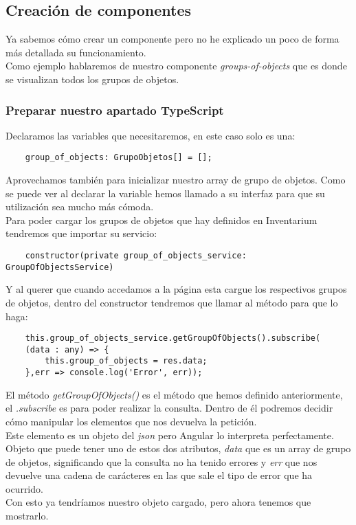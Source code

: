 \subsection{Creación de componentes}
Ya sabemos cómo crear un componente pero no he explicado un poco de forma más detallada su funcionamiento.
\\Como ejemplo hablaremos de nuestro componente \textit{groups-of-objects} que es donde se visualizan todos los grupos de objetos.

\subsubsection{Preparar nuestro apartado TypeScript}
Declaramos las variables que necesitaremos, en este caso solo es una:
\begin{verbatim}
    group_of_objects: GrupoObjetos[] = [];
\end{verbatim}
Aprovechamos también para inicializar nuestro array de grupo de objetos. Como se puede ver al declarar la variable hemos llamado a su interfaz para que su utilización sea mucho más cómoda.
\\Para poder cargar los grupos de objetos que hay definidos en Inventarium tendremos que importar su servicio:
\begin{verbatim}
    constructor(private group_of_objects_service: GroupOfObjectsService)
\end{verbatim}
Y al querer que cuando accedamos a la página esta cargue los respectivos grupos de objetos, dentro del constructor tendremos que llamar al método para que lo haga:
\begin{verbatim}
    this.group_of_objects_service.getGroupOfObjects().subscribe(
    (data : any) => { 
        this.group_of_objects = res.data;
    },err => console.log('Error', err));
\end{verbatim}
El método \textit{getGroupOfObjects()} es el método que hemos definido anteriormente, el \textit{.subscribe} es para poder realizar la consulta. Dentro de él podremos decidir cómo manipular los elementos que nos devuelva la petición.
\\Este elemento es un objeto del \textit{json} pero Angular lo interpreta perfectamente. Objeto que puede tener uno de estos dos atributos, \textit{data} que es un array de grupo de objetos, significando que la consulta no ha tenido errores y \textit{err} que nos devuelve una cadena de carácteres en las que sale el tipo de error que ha ocurrido.
\\Con esto ya tendríamos nuestro objeto cargado, pero ahora tenemos que mostrarlo.

